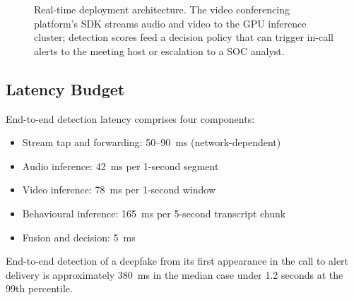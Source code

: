\documentclass[sigconf,nonacm]{acmart}
\begin{document}
\begin{figure}[h]
\centering
{}%
\caption{Real-time deployment architecture. The video conferencing
  platform's SDK streams audio and video to the GPU inference cluster;
  detection scores feed a decision policy that can trigger in-call
  alerts to the meeting host or escalation to a SOC analyst.}
\label{fig:deploy}
\end{figure}

\subsection{Latency Budget}

End-to-end detection latency comprises four components:

\begin{itemize}
  \item Stream tap and forwarding: 50--90~ms (network-dependent)
  \item Audio inference: 42~ms per 1-second segment
  \item Video inference: 78~ms per 1-second window
  \item Behavioural inference: 165~ms per 5-second transcript chunk
  \item Fusion and decision: 5~ms
\end{itemize}

End-to-end detection of a deepfake from its first appearance in the
call to alert delivery is approximately 380~ms in the median case
under 1.2 seconds at the 99th percentile.
\end{document}
